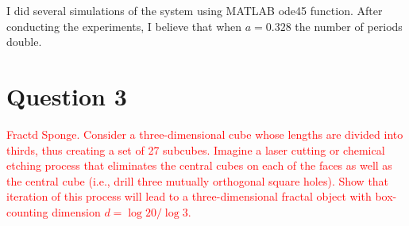 \documentclass[12pt]{article}
\begin{document}
\vspace{0.2 in}

I did several simulations of the system using MATLAB ode45 function. After conducting the experiments, I believe that when $a = 0.328$ the number of periods double.\\




\newpage

\section{Question 3}
\textcolor{red}{Fractd Sponge. Consider a three-dimensional cube whose lengths are divided into thirds, thus creating a set of 27 subcubes. Imagine a laser cutting or chemical etching process that eliminates the central cubes on each of the faces as well as the central cube (i.e., drill three mutually orthogonal square holes). Show that iteration of this process will lead to a three-dimensional
fractal object with box-counting dimension $d = \log 20/\log 3$.}\\
\end{document}
